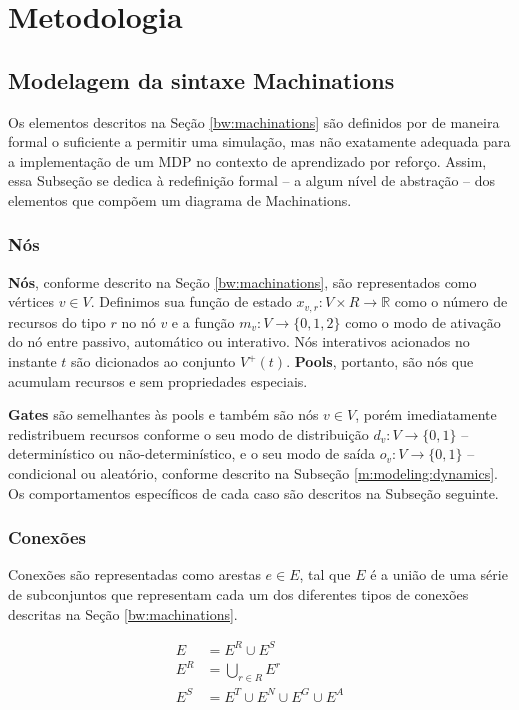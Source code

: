 \documentclass[10pt,a4paper]{article}
\begin{document}
\section{Metodologia}
\label{m}

\subsection{Modelagem da sintaxe Machinations}
\label{m:modeling}
Os elementos descritos na Seção \ref{bw:machinations} são definidos por \citeauthor{machinations} de maneira formal o suficiente a permitir uma simulação, mas não exatamente adequada para a implementação de um MDP no contexto de aprendizado por reforço. Assim, essa Subseção se dedica à redefinição formal -- a algum nível de abstração -- dos elementos que compõem um diagrama de Machinations.

\subsubsection{Nós}
\textbf{Nós}, conforme descrito na Seção \ref{bw:machinations}, são representados como vértices $v \in V$. Definimos sua função de estado $x_{v,r}: V \times R \rightarrow \mathbb{R}$ como o número de recursos do tipo $r$ no nó $v$ e a função $m_{v}: V \rightarrow \{0,1,2\}$ como o modo de ativação do nó entre passivo, automático ou interativo. Nós interativos acionados no instante $t$ são dicionados ao conjunto $V^+(t)$. \textbf{Pools}, portanto, são nós que acumulam recursos e sem propriedades especiais.

\textbf{Gates} são semelhantes às pools e também são nós $v \in V$, porém imediatamente redistribuem recursos conforme o seu modo de distribuição $d_v : V \rightarrow \{0,1\}$ -- determinístico ou não-determinístico, e o seu modo de saída $o_v: V \rightarrow \{0,1\}$ -- condicional ou aleatório, conforme descrito na Subseção \ref{m:modeling:dynamics}. Os comportamentos específicos de cada caso são descritos na Subseção seguinte. 


\subsubsection{Conexões}
\label{m:modeling:connections}
Conexões são representadas como arestas $e \in E$, tal que $E$ é a união de uma série de subconjuntos que representam cada um dos diferentes tipos de conexões descritas na Seção \ref{bw:machinations}.

\begin{align*}
    E &= E^R \cup E^S\\
    E^R &= \bigcup_{r \in R} E^r\\
    E^S &= E^{T} \cup E^{N} \cup E^{G} \cup E^{A}
\end{align*}
\end{document}
